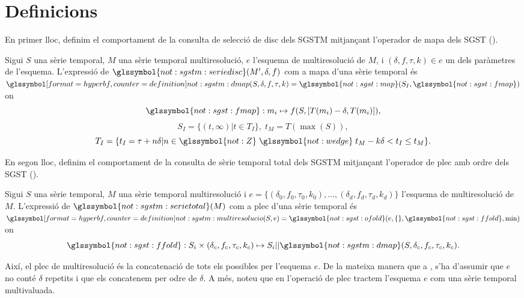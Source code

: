 \section{Definicions}

En primer lloc, definim el comportament de la consulta de selecció de disc
dels \gls{SGSTM} mitjançant l'operador de mapa dels \gls{SGST}
().


\begin{definition}
Sigui $S$ una sèrie temporal, $M$ una sèrie temporal multiresolució,
$e$ l'esquema de multiresolució de $M$, i $(\delta,f,\tau,k)\in e$
un dels paràmetres de l'esquema. L'expressió de
$\glssymbol{not:sgstm:seriedisc}(M',\delta,f)$ com a mapa d'una sèrie
temporal és $\glssymboldef{not:sgstm:dmap}(S,\delta,f,\tau,k)=
\glssymbol{not:sgst:map}(S_I,\glssymbol{not:sgst:fmap})$ on
  \[
  \glssymbol{not:sgst:fmap}: m_i\mapsto f(S, [T(m_i)-\delta,T(m_i)]),
  \]
  \[
  S_I = \{ (t,\infty) | t\in T_I  \},\;  t_M = T(\max(S)),
  \]
  \[
  T_I = \{ t_I = \tau+n\delta | n\in\glssymbol{not:Z}\; \glssymbol{not:wedge}\; t_M - k\delta <
  t_I \leq t_M \}.
  \]
\end{definition}




En segon lloc, definim el comportament de la consulta de sèrie
temporal total dels \gls{SGSTM} mitjançant l'operador de plec amb
ordre dels \gls{SGST} ().


\begin{definition}
  \label{def:multiresolucio:plecmu}
  Sigui $S$ una sèrie temporal, $M$ una sèrie temporal multiresolució
  i $e = \{ (\delta_0,f_0,\tau_0,k_0), \ldots,
  (\delta_d,f_d,\tau_d,k_d)\}$ l'esquema de multiresolució de $M$.
  L'expressió de $\glssymbol{not:sgstm:serietotal}(M)$ com a plec
  d'una sèrie temporal és
  $\glssymboldef{not:sgstm:multiresolucio}(S,e)=
  \glssymbol{not:sgst:ofold}(e,\{\},\glssymbol{not:sgst:ffold},\min)$
  on 
  \[
  \glssymbol{not:sgst:ffold}: S_i \times (\delta_c,f_c,\tau_c,k_c)
  \mapsto S_i ||
  \glssymbol{not:sgstm:dmap}(S,\delta_c,f_c,\tau_c,k_c).
  \]
  
  Així, el plec de multiresolució és la concatenació de tots els
   possibles per l'esquema $e$. De la
  mateixa manera que a , s'ha d'assumir que
  $e$ no conté $\delta$ repetits i que els concatenem per odre de
  $\delta$. A més, noteu que en l'operació de plec tractem l'esquema
  $e$ com una sèrie temporal multivaluada.

\end{definition}





